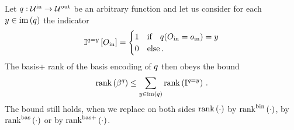 \begin{theorem}
    Let $q : \mathcal{U}^{\mathrm{in}} \rightarrow \mathcal{U}^{\mathrm{out}}$ be an arbitrary function and let us consider for each $y\in\mathrm{im}\left(q\right)$ the indicator
    \begin{align*}
        \mathbb{I}^{q=y}\left[O_{\mathrm{in}}\right] =
        \begin{cases}
            1 & \text{if} \quad q(O_{\mathrm{in}}=o_{\mathrm{in}})=y \\
            0 & \text{else} \, .
        \end{cases}
    \end{align*}
    The basis+ rank of the basis encoding of $q$ then obeys the bound
    \begin{align*}
        \mathrm{rank}\left(\beta^{q}\right) \leq \sum_{y\in\mathrm{im}\left(q\right)} \mathrm{rank}\left(\mathbb{I}^{q=y} \right) \, .
    \end{align*}
    The bound still holds, when we replace on both sides $\mathrm{rank}\left(\cdot\right)$ by $\mathrm{rank}^{\mathrm{bin}}\left(\cdot\right)$, by $\mathrm{rank}^{\mathrm{bas}}\left(\cdot\right)$ or by $\mathrm{rank}^{\mathrm{bas+}}\left(\cdot\right)$.
\end{theorem}
